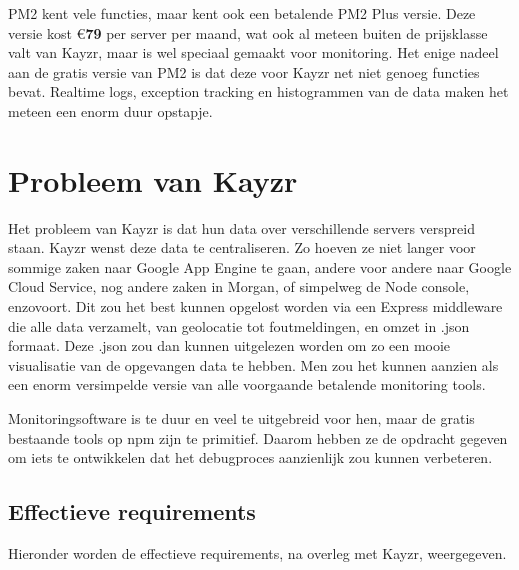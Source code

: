 PM2 kent vele functies, maar kent ook een betalende PM2 Plus versie. Deze versie kost \euro\textbf{79} per server per maand, wat ook al meteen buiten de prijsklasse valt van Kayzr, maar is wel speciaal gemaakt voor monitoring. Het enige nadeel aan de gratis versie van PM2 is dat deze voor Kayzr net niet genoeg functies bevat. Realtime logs, exception tracking en histogrammen van de data maken het meteen een enorm duur opstapje.

\section{Probleem van Kayzr}
\label{sec:kayzrProblem}

Het probleem van Kayzr is dat hun data over verschillende servers verspreid staan. Kayzr wenst deze data te centraliseren. Zo hoeven ze niet langer voor sommige zaken naar Google App Engine te gaan, andere voor andere naar Google Cloud Service, nog andere zaken in Morgan, of simpelweg de Node console, enzovoort. Dit zou het best kunnen opgelost worden via een Express middleware die alle data verzamelt, van geolocatie tot foutmeldingen, en omzet in .json formaat. Deze .json zou dan kunnen uitgelezen worden om zo een mooie visualisatie van de opgevangen data te hebben. Men zou het kunnen aanzien als een enorm versimpelde versie van alle voorgaande betalende monitoring tools. 

Monitoringsoftware is te duur en veel te uitgebreid voor hen, maar de gratis bestaande tools op npm zijn te primitief. Daarom hebben ze de opdracht gegeven om iets te ontwikkelen dat het debugproces aanzienlijk zou kunnen verbeteren. 

\subsection{Effectieve requirements}
\label{sec:requirements}

Hieronder worden de effectieve requirements, na overleg met Kayzr, weergegeven.

